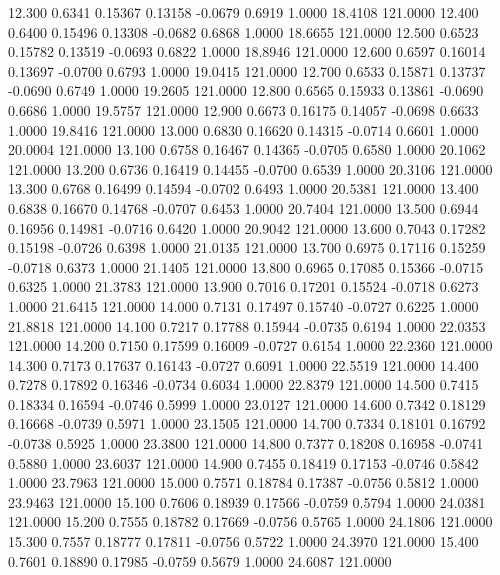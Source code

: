   12.300   0.6341   0.15367   0.13158  -0.0679   0.6919   1.0000  18.4108 121.0000
  12.400   0.6400   0.15496   0.13308  -0.0682   0.6868   1.0000  18.6655 121.0000
  12.500   0.6523   0.15782   0.13519  -0.0693   0.6822   1.0000  18.8946 121.0000
  12.600   0.6597   0.16014   0.13697  -0.0700   0.6793   1.0000  19.0415 121.0000
  12.700   0.6533   0.15871   0.13737  -0.0690   0.6749   1.0000  19.2605 121.0000
  12.800   0.6565   0.15933   0.13861  -0.0690   0.6686   1.0000  19.5757 121.0000
  12.900   0.6673   0.16175   0.14057  -0.0698   0.6633   1.0000  19.8416 121.0000
  13.000   0.6830   0.16620   0.14315  -0.0714   0.6601   1.0000  20.0004 121.0000
  13.100   0.6758   0.16467   0.14365  -0.0705   0.6580   1.0000  20.1062 121.0000
  13.200   0.6736   0.16419   0.14455  -0.0700   0.6539   1.0000  20.3106 121.0000
  13.300   0.6768   0.16499   0.14594  -0.0702   0.6493   1.0000  20.5381 121.0000
  13.400   0.6838   0.16670   0.14768  -0.0707   0.6453   1.0000  20.7404 121.0000
  13.500   0.6944   0.16956   0.14981  -0.0716   0.6420   1.0000  20.9042 121.0000
  13.600   0.7043   0.17282   0.15198  -0.0726   0.6398   1.0000  21.0135 121.0000
  13.700   0.6975   0.17116   0.15259  -0.0718   0.6373   1.0000  21.1405 121.0000
  13.800   0.6965   0.17085   0.15366  -0.0715   0.6325   1.0000  21.3783 121.0000
  13.900   0.7016   0.17201   0.15524  -0.0718   0.6273   1.0000  21.6415 121.0000
  14.000   0.7131   0.17497   0.15740  -0.0727   0.6225   1.0000  21.8818 121.0000
  14.100   0.7217   0.17788   0.15944  -0.0735   0.6194   1.0000  22.0353 121.0000
  14.200   0.7150   0.17599   0.16009  -0.0727   0.6154   1.0000  22.2360 121.0000
  14.300   0.7173   0.17637   0.16143  -0.0727   0.6091   1.0000  22.5519 121.0000
  14.400   0.7278   0.17892   0.16346  -0.0734   0.6034   1.0000  22.8379 121.0000
  14.500   0.7415   0.18334   0.16594  -0.0746   0.5999   1.0000  23.0127 121.0000
  14.600   0.7342   0.18129   0.16668  -0.0739   0.5971   1.0000  23.1505 121.0000
  14.700   0.7334   0.18101   0.16792  -0.0738   0.5925   1.0000  23.3800 121.0000
  14.800   0.7377   0.18208   0.16958  -0.0741   0.5880   1.0000  23.6037 121.0000
  14.900   0.7455   0.18419   0.17153  -0.0746   0.5842   1.0000  23.7963 121.0000
  15.000   0.7571   0.18784   0.17387  -0.0756   0.5812   1.0000  23.9463 121.0000
  15.100   0.7606   0.18939   0.17566  -0.0759   0.5794   1.0000  24.0381 121.0000
  15.200   0.7555   0.18782   0.17669  -0.0756   0.5765   1.0000  24.1806 121.0000
  15.300   0.7557   0.18777   0.17811  -0.0756   0.5722   1.0000  24.3970 121.0000
  15.400   0.7601   0.18890   0.17985  -0.0759   0.5679   1.0000  24.6087 121.0000
